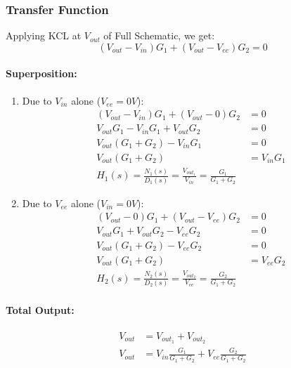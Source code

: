 \subsubsection{Transfer Function}
Applying KCL at $V_{out}$ of Full Schematic, we get:
\[
  (V_{out} - V_{in}){G_1} + (V_{out} - V_{ee}){G_2} = 0
\]
\paragraph{Superposition:}
\begin{enumerate}
  \item Due to \(V_{in}\) alone (\(V_{ee} = 0V\)):
    \begin{align*}
      (V_{out} - V_{in}){G_1} + (V_{out} - 0){G_2} &= 0 \\
      V_{out}G_1 - V_{in}G_1 + V_{out}G_2 &= 0 \\
      V_{out}(G_1 + G_2) - V_{in}G_1 &= 0 \\
      V_{out}(G_1 + G_2) &= V_{in}G_1 \\
      \boxed{H_1(s) = \frac{N_1(s)}{D_1(s)} = \frac{V_{out_1}}{V_{in}} = \frac{G_1}{G_1 + G_2}}
    \end{align*}
  \item Due to \(V_{ee}\) alone (\(V_{in} = 0V\)):
    \begin{align*}
      (V_{out} - 0){G_1} + (V_{out} - V_{ee}){G_2} &= 0 \\
      V_{out}G_1 + V_{out}G_2 - V_{ee}G_2 &= 0 \\
      V_{out}(G_1 + G_2) - V_{ee}G_2 &= 0 \\
      V_{out}(G_1 + G_2) &= V_{ee}G_2 \\
      \boxed{H_2(s) = \frac{N_2(s)}{D_2(s)} = \frac{V_{out_2}}{V_{ee}} = \frac{G_2}{G_1 + G_2}}
    \end{align*}
\end{enumerate}
\paragraph{Total Output:}
\begin{align*}
  V_{out} &= V_{out_1} + V_{out_2} \\
  V_{out} &= V_{in} \frac{G_1}{G_1 + G_2} + V_{ee} \frac{G_2}{G_1 + G_2}
\end{align*}

